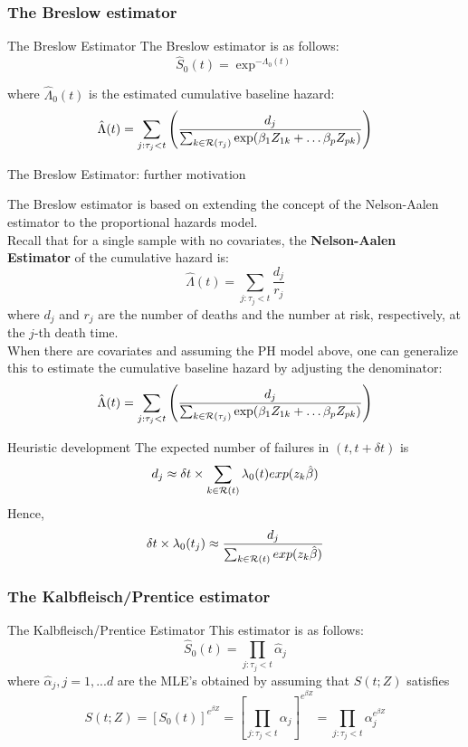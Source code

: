 \documentclass[envcountsect, 10pt, portrait, palatino]{beamer}
\begin{document}
\subsubsection{The Breslow estimator}
\begin{frame}{The Breslow Estimator}
The Breslow estimator is as follows:
\[ \hat{S}_0(t) = \exp^{-\hat{\Lambda}_0(t)} \]

where $\hat{\Lambda}_0(t)$ is the estimated cumulative baseline hazard:
\[   \hat{\Lambda}(t)  =\sum_{j: \tau_j < t} \left( \frac{d_j}
           {\sum_{k\in {\cal R}(\tau_j)}
      \exp(\beta_1 Z_{1k} + \dots \beta_p Z_{pk})} \right)
\]
\end{frame}
\begin{frame}{The Breslow Estimator:  further motivation}

The Breslow estimator is based on extending the concept of
the Nelson-Aalen estimator to the proportional hazards model.
\\[2ex]
Recall that for a single sample with no covariates, the
{\bf Nelson-Aalen Estimator} of the cumulative hazard is:
\[ \hat{\Lambda}(t)  =\sum_{j: \tau_j < t} \frac{d_j}{r_j} \]
where $d_j$ and $r_j$ are the number of deaths and the
number at risk, respectively, at the $j$-th death time.
\\[2ex]
When there are covariates and assuming the PH model above, one
can generalize this to estimate the cumulative baseline hazard
by adjusting the denominator:
\[ \hat{\Lambda}(t)  =\sum_{j: \tau_j < t} \left( \frac{d_j}
           {\sum_{k\in {\cal R}(\tau_j)}
      \exp(\beta_1 Z_{1k} + \dots \beta_p Z_{pk})} \right)
\]
\end{frame}

\begin{frame}{Heuristic development} 
The expected number of failures in $(t,t+\delta t)$ is
\[ d_j \approx \delta t \times \sum_{k\in {\cal R}(t)} \lambda_0(t)
exp(z_k\hat{\beta}) \]
Hence,
\[ \delta t \times  \lambda_0(t_j) \approx \frac{d_j}{\sum_{k\in {\cal R}(t)}
  exp(z_k\hat{\beta})}     \]
\end{frame}
\subsubsection{The Kalbfleisch/Prentice estimator}
\begin{frame}{The Kalbfleisch/Prentice Estimator}
This estimator is as follows:
\[ \hat{S}_0(t) = \prod_{j: \tau_j < t} \hat{\alpha}_j   \]
where $\hat{\alpha}_j, j=1,...d$ are the MLE's obtained by assuming
that $S(t;Z)$ satisfies
\[ S(t;Z) =  [S_0(t)]^{e^{\beta Z}}  =
\left[\prod_{j: \tau_j < t} \alpha_j\right]^{e^{\beta Z}}
= \prod_{j: \tau_j < t} \alpha_j^{e^{\beta Z}} \]

\end{frame}
\end{document}
